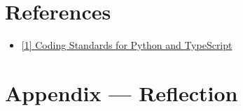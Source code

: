 \documentclass{article}
\begin{document}
\section{References}
\begin{itemize}
  \item
  \href{https://github.com/pylint-dev/pylint/}{[1] Coding Standards for Python and TypeScript}
\end {itemize}

\newpage{}

\section*{Appendix --- Reflection}


% 
\end{document}
